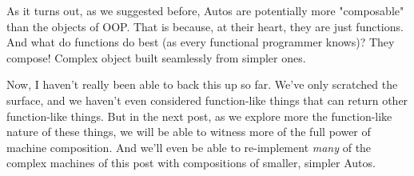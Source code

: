 \documentclass[]{article}
\begin{document}
As it turns out, as we suggested before, Autos are potentially more "composable"
than the objects of OOP. That is because, at their heart, they are just
functions. And what do functions do best (as every functional programmer knows)?
They compose! Complex object built seamlessly from simpler ones.

Now, I haven't really been able to back this up so far. We've only scratched the
surface, and we haven't even considered function-like things that can return
other function-like things. But in the next post, as we explore more the
function-like nature of these things, we will be able to witness more of the
full power of machine composition. And we'll even be able to re-implement
\emph{many} of the complex machines of this post with compositions of smaller,
simpler Autos.
\end{document}

